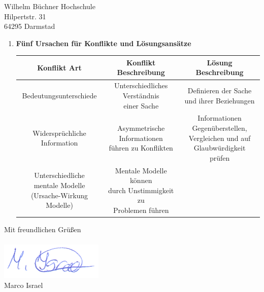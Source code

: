 \documentclass[
    version=last,           %
    DIV=13,                 %
    BCOR=0mm,               %
    paper=a4,               %
    fontsize=12pt,          %
    firsthead=on,           %
    firstfoot=on,           %
    pagenumber=on,i         %
    parskip=half,           %
    enlargefirstpage=,      %
    firsthead=on,           %
    fromrule=afteraddress,  %
    priority=off,           %
    backaddress=true,       %
    refline=dateright,      %
	fromalign=right,	    %
    fromemail=on,i          %
    fromurl=on,             %
    frombank=on,
    fromphone=on,           %
    frommobilephone=on      %
    fromlogo=on,            %
    addrfield=on,           %
    subject=untitled,  %
    foldmarks=off,          %
    numericaldate=off,      %
	pagenumber=right,	        %
	parskip=half,	        %
    headsep=false,          %
    footsepline=true,       %
    foldmarks=off,		    %
	]{scrlttr2}
\begin{document}
\begin{letter} {Wilhelm Büchner Hochschule \\
Hilpertstr. 31\\
64295 Darmstad}
\begin{itemize}
\begin{enumerate}
            \vspace{1cm}
            \item \textbf{ Fünf Ursachen für Konflikte  und Lösungsansätze }
                \\
            \vspace{0.2cm}
            \begin{tabular}{|c|c|c| }
                \hline  Konflikt Art  & Konflikt Beschreibung & Lösung Beschreibung\\
                \hline Bedeutungsunterschiede & \thead{Unterschiedliches Verständnis
                \\ einer Sache } & \thead{ Definieren der Sache \\ und ihrer Beziehungen }\\
                \hline \thead{Widersprüchliche \\ Information } & \thead{
                Asymmetrische Informationen \\ führen zu Konflikten } & \thead{
                Informationen Gegenüberstellen, \\ Vergleichen und auf
             \\Glaubwürdigkeit prüfen} \\
             \hline \thead{Unterschiedliche \\ mentale Modelle \\ (Ursache-Wirkung Modelle) } & \thead {Mentale
             Modelle können \\ durch Unstimmigkeit zu \\ Problemen führen }  &
                \end{tabular}

        \end{enumerate}
\end{itemize}
\vspace{1cm}
Mit freundlichen Grüßen \\
\\
    \includegraphics[scale=0.70]{../unterschrift.png}
    \\
    Marco Israel




%



\end{letter}
\end{document}
